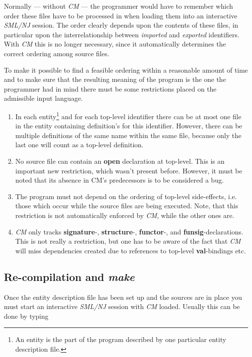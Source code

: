 Normally --- without {\em CM} --- the programmer would have to remember
which order these files have to be processed in when loading them into an
interactive {\em SML/NJ} session.  The order clearly depends upon the
contents of these files, in particular upon the interrelationship between
{\em imported} and {\em exported} identifiers.  With {\em CM} this is no
longer necessary, since it automatically determines the correct ordering
among source files.

To make it possible to find a feasible ordering within a reasonable amount
of time and to make sure that the resulting meaning of the program is the
one the programmer had in mind there must be some restrictions placed on
the admissible input language.

\begin{enumerate}
\item
In each entity\footnote{An entity is the part of the program described by
one particular entity description file.} and for each top-level identifier
there can be at most one file in the entity containing definition's for
this identifier.  However, there can be multiple definitions of the same
name within the same file, because only the last one will count as a
top-level definition.
\item
No source file can contain an {\bf open} declaration at top-level.  This is
an important new restriction, which wasn't present before.  However, it
must be noted that its absence in CM's predecessors is to be considered a
bug.
\item
The program must not depend on the ordering of top-level side-effects,
i.e. those which occur while the source files are being executed.  Note,
that this restriction is not automatically enforced by {\em CM}, while the
other ones are.
\item
{\em CM} only tracks {\bf signature}-, {\bf structure}-, {\bf functor}-,
and {\bf funsig}-declarations.  This is not really a restriction, but one
has to be aware of the fact that {\em CM} will miss dependencies created
due to references to top-level {\bf val}-bindings etc.
\end{enumerate}

\subsection{Re-compilation and {\em make}}

Once the entity description file has been set up and the sources are in
place you must start an interactive {\em SML/NJ} session with {\em CM}
loaded.  Usually this can be done by typing


